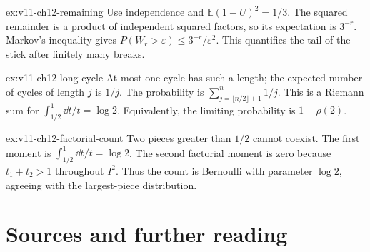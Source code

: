 \begin{solution}{ex:v11-ch12-remaining}
\idea Use independence and $\mathbb E(1-U)^2=1/3$.
\writeup The squared remainder is a product of independent squared factors, so its expectation is $3^{-r}$. Markov's inequality gives $P(W_r>\varepsilon)\le3^{-r}/\varepsilon^2$. This quantifies the tail of the stick after finitely many breaks.
\end{solution}

\begin{solution}{ex:v11-ch12-long-cycle}
\idea At most one cycle has such a length; the expected number of cycles of length $j$ is $1/j$.
\writeup The probability is $\sum_{j=\lfloor n/2\rfloor+1}^n1/j$. This is a Riemann sum for $\int_{1/2}^1\dd t/t=\log2$. Equivalently, the limiting probability is $1-\rho(2)$.
\end{solution}

\begin{solution}{ex:v11-ch12-factorial-count}
\idea Two pieces greater than $1/2$ cannot coexist.
\writeup The first moment is $\int_{1/2}^1\dd t/t=\log2$. The second factorial moment is zero because $t_1+t_2>1$ throughout $I^2$. Thus the count is Bernoulli with parameter $\log2$, agreeing with the largest-piece distribution.
\end{solution}

\section*{Sources and further reading}

